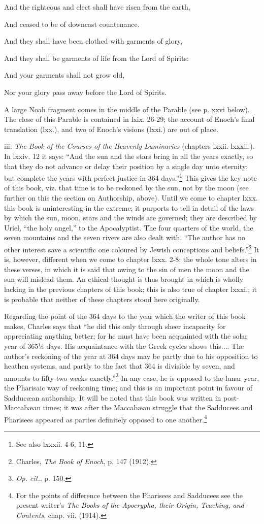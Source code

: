 And the righteous and elect shall have risen from the earth,

And ceased to be of downcast countenance.

And they shall have been clothed with garments of glory,

And they shall be garments of life from the Lord of Spirits:

And your garments shall not grow old,

Nor your glory pass away before the Lord of Spirits.

A large Noah fragment comes in the middle of the
Parable (see p. xxvi below). The close of this Parable
is contained in lxix. 26-29; the account of Enoch’s
final translation (lxx.), and two of Enoch’s visions
(lxxi.) are out of place.

iii. \emph{The Book of the Courses of the Heavenly Luminaries}
(chapters lxxii.-lxxxii.). In lxxiv. 12 it says:
“And the sun and the stars bring in all the years
exactly, so that they do not advance or delay their
position by a single day unto eternity; but complete
the years with perfect justice in 364 days.”\footnote{See also lxxxii. 4-6, 11.} This
gives the key-note of this book, viz. that time is to
be reckoned by the sun, not by the moon (see further
on this the section on Authorship, above). Until we
come to chapter lxxx. this book is uninteresting in
the extreme; it purports to tell in detail of the laws
by which the sun, moon, stars and the winds are
governed; they are described by Uriel, “the holy
angel,” to the Apocalyptist. The four quarters of
the world, the seven mountains and the seven rivers
are also dealt with. “The author has no other
interest save a scientific one coloured by Jewish
conceptions and beliefs.”\footnote{Charles, \emph{The Book of Enoch}, p. 147 (1912).} It is, however, different
when we come to chapter lxxx. 2-8; the whole tone
alters in these verses, in which it is said that owing
to the sin of men the moon and the sun will mislead
them. An ethical thought is thus brought in
which is wholly lacking in the previous chapters of
this book; this is also true of chapter lxxxi.; it is
probable that neither of these chapters stood here
originally.

Regarding the point of the 364 days to the year
which the writer of this book makes, Charles says
that “he did this only through sheer incapacity for
appreciating anything better; for he must have been
acquainted with the solar year of 365¼ days. His
acquaintance with the Greek cycles shows this....
The author’s reckoning of the year at 364 days may
be partly due to his opposition to heathen systems,
and partly to the fact that 364 is divisible by seven,
and amounts to fifty-two weeks exactly.”\footnote{\emph{Op. cit.}, p. 150.} In any
case, he is opposed to the lunar year, the Pharisaic
way of reckoning time; and this is an important
point in favour of Sadducæan authorship. It will
be noted that this book was written in post-Maccabæan
times; it was after the Maccabæan struggle
that the Sadducees and Pharisees appeared as parties
definitely opposed to one another.\footnote{For the points of difference between the Pharisees and
Sadducees see the present writer’s \emph{The Books of the Apocrypha,
their Origin, Teaching, and Contents}, chap. vii. (1914).}

